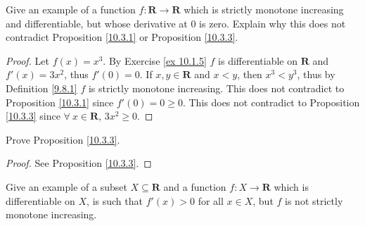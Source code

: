 \begin{exercise}\label{ex 10.3.3}
    Give an example of a function \(f : \mathbf{R} \to \mathbf{R}\) which is strictly monotone increasing and differentiable, but whose derivative at \(0\) is zero.
    Explain why this does not contradict Proposition \ref{10.3.1} or Proposition \ref{10.3.3}.
\end{exercise}

\begin{proof}
    Let \(f(x) = x^3\).
    By Exercise \ref{ex 10.1.5} \(f\) is differentiable on \(\mathbf{R}\) and \(f'(x) = 3x^2\), thus \(f'(0) = 0\).
    If \(x, y \in \mathbf{R}\) and \(x < y\), then \(x^3 < y^3\), thus by Definition \ref{9.8.1} \(f\) is strictly monotone increasing.
    This does not contradict to Proposition \ref{10.3.1} since \(f'(0) = 0 \geq 0\).
    This does not contradict to Proposition \ref{10.3.3} since \(\forall\ x \in \mathbf{R}\), \(3x^2 \geq 0\).
\end{proof}

\begin{exercise}\label{ex 10.3.4}
    Prove Proposition \ref{10.3.3}.
\end{exercise}

\begin{proof}
    See Proposition \ref{10.3.3}.
\end{proof}

\begin{exercise}\label{ex 10.3.5}
    Give an example of a subset \(X \subseteq \mathbf{R}\) and a function \(f : X \to \mathbf{R}\) which is differentiable on \(X\), is such that \(f'(x) > 0\) for all \(x \in X\), but \(f\) is not strictly monotone increasing.
\end{exercise}